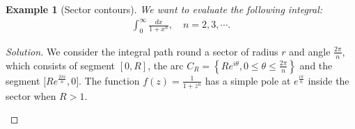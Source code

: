 \documentclass{article}
\numberwithin{equation}{section}
\theoremstyle{plain}
\newtheorem{example}[theorem]{Example}
\theoremstyle{definition}
\begin{document}
\begin{example}[Sector contours]
We want to evaluate the following integral:
\begin{align*}
	\int_0^\infty\frac{dx}{1+x^n},\quad n=2,3,\cdots.
\end{align*}
\end{example}
\begin{proof}[Solution]
We consider the integral path round a sector of radius $r$ and angle $\frac{2\pi}{n}$, which consists of segment $[0,R]$, the arc $C_R=\left\{Re^{i\theta},0\leq\theta\leq\frac{2\pi}{n}\right\}$ and the segment $\bigl[Re^{\frac{2\pi i}{n}},0\bigr]$. The function $f(z)=\frac{1}{1+z^n}$ has a simple pole at $e^{\frac{i\pi}{n}}$ inside the sector when $R>1$.
\begin{center}
\end{center}
\end{proof}
\end{document}
